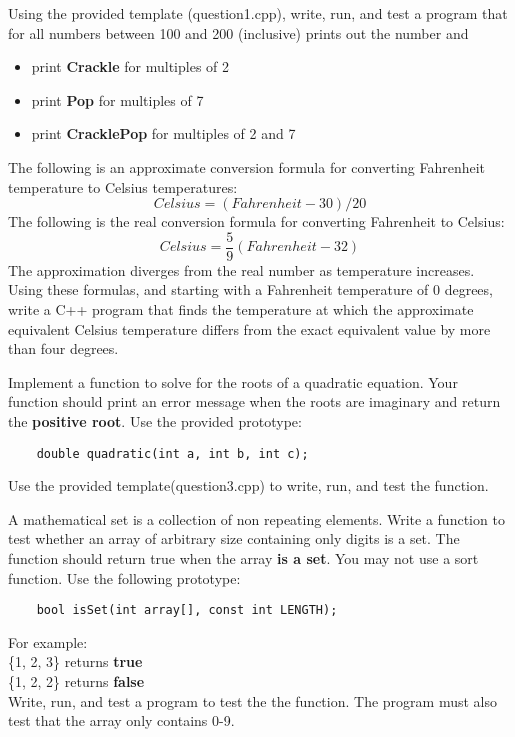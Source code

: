 \documentclass[addpoints,12pt]{exam}
\begin{document}
\begin{questions}

\question [15]
Using the provided template (question1.cpp), write, run, and test a program that for all numbers between 100 and 200 (inclusive) prints out the number and
\begin{itemize}
	\item print \textbf{Crackle} for multiples of 2
	\item print \textbf{Pop} for multiples of 7
	\item print \textbf{CracklePop} for multiples of 2 and 7
\end{itemize}

\question[25]
The following is an approximate conversion formula for converting Fahrenheit temperature to Celsius temperatures:
\begin{equation}
Celsius = (Fahrenheit - 30)/20
\end{equation}
The following is the real conversion formula for converting Fahrenheit to Celsius:
\begin{equation}
Celsius =  \frac{5}{9}(Fahrenheit - 32)
\end{equation}
The approximation diverges from the real  number as temperature increases. Using these formulas, and starting with a Fahrenheit temperature of 0 degrees, write a C++ program that finds the temperature at which the approximate equivalent Celsius temperature differs from the exact equivalent value by more than four degrees.


\question[25]
Implement a function to solve for the roots of a quadratic equation. Your function should print an error message when the roots are imaginary and return the \textbf{positive root}.  Use the provided prototype:
\begin{lstlisting}
	double quadratic(int a, int b, int c);
\end{lstlisting}
Use the provided template(question3.cpp) to write, run, and test the function.

\pagebreak
\question[35]
A mathematical set is a collection of non repeating elements. Write a function to test whether an array of arbitrary size containing only digits is a set. The function should return true when the array \textbf{is a set}. You may not use a sort function. Use the following prototype:
\begin{lstlisting}
	bool isSet(int array[], const int LENGTH);
\end{lstlisting}

For example:\\
\{1, 2, 3\} returns \textbf{true}\\
\{1, 2, 2\} returns \textbf{false}\\

Write, run, and test a program to test the the function. The program must also test that the array only contains 0-9.


\end{questions}
\end{document}
